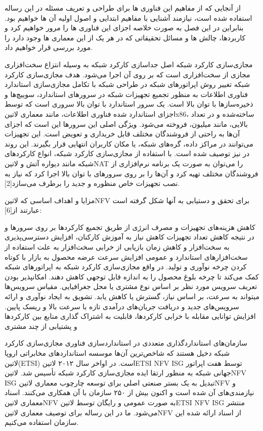 از آنجایی که از مفاهیم این فناوری ها برای طراحی و تعریف مسئله در این رساله استفاده شده است، نیازمند آشنایی با مفاهیم ابتدایی و اصول اولیه آن ها خواهیم بود. بنابراین در این فصل به صورت خلاصه اجزای این فناوری ها را مرور خواهیم کرد و کاربردها، چالش ها و مسائل تحقیقاتی که در هر یک از این معماری ها وجود دارد را مورد بررسی قرار خواهیم داد.

مجازی‌سازی کارکرد شبکه اصل جداسازی کارکرد شبکه به وسیله انتزاع سخت‌افزاری مجازی از سخت‌افزاری است که بر روی آن اجرا می‌شود.
هدف مجازی‌سازی کارکرد شبکه تغییر روش اپراتورهای شبکه در طراحی شبکه با تکامل مجازی‌سازی استاندارد فناوری اطلاعات به منظور تجمیع تجهیزات شبکه در سرورهای استاندارد،
سوییچ‌ها و ذخیره‌سازها با توان بالا است.
یک سرور استاندارد با توان بالا سروری است که توسط اجزای استاندارد شده فناوری اطلاعات، مانند معماری ‌لاتین{x86}، ساخته‌شده و در تعداد بالایی، مانند میلیون، فروخته می‌شود.
ویژگی اصلی این سرورها این است که اجزای آن‌ها به راحتی از فروشندگان مختلف قابل خریداری و تعویض است.
این تجهیزات می‌توانند در مراکز داده، گره‌های شبکه، یا مکان کاربران انتهایی قرار بگیرند.
این روند در  نیز توصیف شده است. با استفاده از مجازی‌سازی کارکرد شبکه، انواع کارکردهای شبکه مانند دیواره آتش و ‌لاتین{NAT} را می‌توان
به صورت یک برنامه نرم‌افزاری از فروشندگان مختلف تهیه کرد و آن‌ها را بر روی سرورهای با توان بالا اجرا کرد که نیاز به نصب تجهیزات خاص منظوره و جدید را برطرف می‌سازد[2].

مزایا و اهداف اساسی که ‌لاتین{NFV} برای تحقق و دست‍یابی به آن‍ها شکل گرفته است عبارتند از[6]:

 کاهش هزینه‌های تجهیزات و مصرف انرژی از طریق تجمیع کارکردها بر روی سرورها و در نتیجه کاهش تعداد تجهیزات
 کاهش نیاز به آموزش کارکنان، افزایش دسترسی‌پذیری به سخت‌افزار و کاهش زمان بازیابی از خرابی سخت‌افزار به علت استفاده از سخت‌افزارهای استاندارد و عمومی
 افزایش سرعت عرضه محصول به بازار با کوتاه کردن چرخه نوآوری و تولید. در واقع مجازی‌سازی کارکرد شبکه به اپراتورهای شبکه کمک می‌کند تا چرخه بلوغ محصول را به اندازه قابل توجهی کاهش دهند.
 امکان‍پذیر بودن تعریف سرویس مورد نظر بر اساس نوع مشتری یا محل جغرافیایی. مقیاس سرویس‌ها می‍تواند به سرعت، بر اساس نیاز، گسترش یا کاهش یابد.
 تشویق به ایجاد نوآوری و ارائه سرویس‌های جدید و دریافت جریان‌های درآمدی تازه با سرعت بالا و ریسک پایین.
 افزایش توانایی مقابله با خرابی کارکردها، قابلیت به اشتراک گذاری منابع بین کارکردها و پشتیابی از چند مشتری

سازمان‌های استانداردگذاری متعددی در استانداردسازی فناوری مجازی‌سازی کارکرد شبکه دخیل هستند که شاخص‌ترین آن‌ها موسسه استانداردهای مخابراتی اروپا ‌لاتین{(ETSI)} است.
در اواخر سال ۲۰۱۲ ‌لاتین{ETSI NFV ISG} توسط هفت اپراتور جهانی شبکه به منظور ارتقا ایده مجازی‌سازی کارکرد شبکه تأسیس شد.
‌لاتین{NFV ISG} تبدیل به یک بستر صنعتی اصلی برای توسعه چارچوب معماری ‌لاتین{NFV} و نیازمندی‌های آن شده است
و اکنون بیش از ۲۵۰ سازمان با آن همکاری می‌کنند. اسناد معماری ‌لاتین{NFV} به صورت عمومی و رایگان توسط ‌لاتین{ETSI NFV ISG} منتشر می‌شود.
ما در این رساله برای توصیف معماری ‌لاتین{NFV} از اسناد ارائه شده این سازمان استفاده می‌کنیم.

